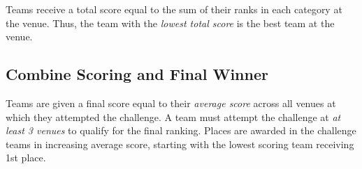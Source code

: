Teams receive a total score equal to the sum of their ranks in each category at the venue. 
Thus, the team with the \textit{lowest total score} is the best team at the venue.

\subsection{Combine Scoring and Final Winner}
Teams are given a final score equal to their \textit{average score} across all venues at which they attempted the challenge. A team must attempt the challenge at \textit{at least 3 venues} to qualify for the final ranking.
Places are awarded in the challenge teams in increasing average score, starting with the lowest scoring team receiving 1st place.

